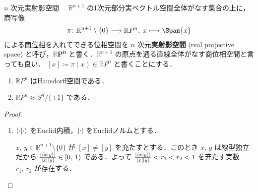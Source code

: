 \documentclass[geometry_main]{subfiles}
\begin{document}
\begin{myexample}[label=ex:topomani-projective]{$n$ 次元実射影空間}
	　$\mathbb{R}^{n+1}$ の1次元部分実ベクトル空間全体がなす集合の上に，商写像
	\begin{align}
		\pi \colon \mathbb{R}^{n+1}\setminus \{0\} \lto \mathbb{R}P^n,\; x \lmto \Span \{x\}
	\end{align}
	による\hyperref[def.quotopo]{商位相}を入れてできる位相空間を $n$ 次元\textbf{実射影空間} (real projective space) と呼び，$\bm{\mathbb{R}P^n}$ と書く．$\mathbb{R}^{n+1}$ の原点を通る直線全体がなす商位相空間と言っても良い．
	$[x] \coloneqq \pi(x) \in \mathbb{R}P^n$ と書くことにする．
	\begin{mylem}[label=lem:RP-Hausdorff]{}
		\begin{enumerate}
			\item $\mathbb{R}P^n$ はHausdorff空間である．
			\item $\mathbb{R}P^n \approx S^n / \{\pm 1\}$ である．
		\end{enumerate}
	\end{mylem}
	\begin{proof}
		\begin{enumerate}
			\item 
			$\braket{\cdot}{\cdot}$ をEuclid内積，$\abs{\cdot}$ をEuclidノルムとする．
			
			$x,\, y \in \mathbb{R}^{n+1}\setminus\{0\}$ が $[x] \neq [y]$ を充たすとする．このとき $x,\, y$ は線型独立だから $\frac{\abs{\braket{x}{y}}}{\abs{x} \abs{y}} \in [0,\, 1)$ である．よって $\frac{\abs{\braket{x}{y}}}{\abs{x} \abs{y}} < r_1 < r_2 < 1$ を充たす実数 $r_1,\, r_2$ が存在する．
			

\end{enumerate}
\end{proof}
\end{myexample}
\end{document}
